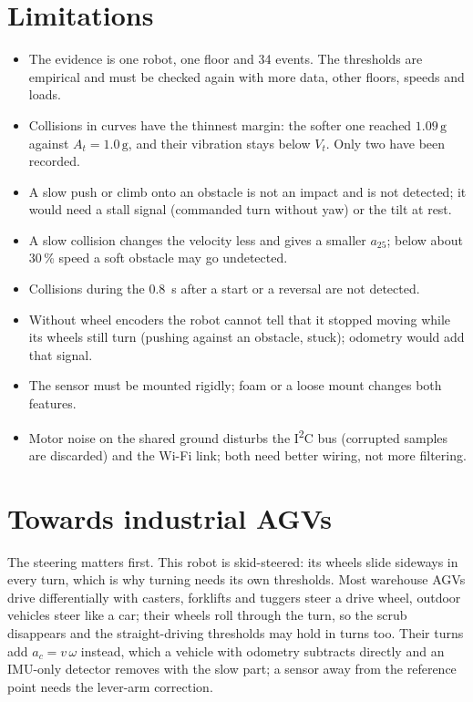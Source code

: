 \documentclass[11pt,a4paper]{article}
\newcommand{\g}{\,\mathrm{g}}
\newcommand{\azf}{a_{25}}
\begin{document}
\clearpage
\section{Limitations}

\begin{itemize}
  \item The evidence is one robot, one floor and 34 events. The thresholds are empirical and
    must be checked again with more data, other floors, speeds and loads.
  \item Collisions in curves have the thinnest margin: the softer one reached $1.09\g$
    against $A_t = 1.0\g$, and their vibration stays below $V_t$. Only two have been recorded.
  \item A slow push or climb onto an obstacle is not an impact and is not detected; it would
    need a stall signal (commanded turn without yaw) or the tilt at rest.
  \item A slow collision changes the velocity less and gives a smaller $\azf$; below about
    30\,\% speed a soft obstacle may go undetected.
  \item Collisions during the \SI{0.8}{\second} after a start or a reversal are not detected.
  \item Without wheel encoders the robot cannot tell that it stopped moving while its wheels
    still turn (pushing against an obstacle, stuck); odometry would add that signal.
  \item The sensor must be mounted rigidly; foam or a loose mount changes both features.
  \item Motor noise on the shared ground disturbs the I\textsuperscript{2}C bus (corrupted
    samples are discarded) and the Wi-Fi link; both need better wiring, not more filtering.
\end{itemize}

\section{Towards industrial AGVs}

The steering matters first. This robot is skid-steered: its wheels slide sideways in every
turn, which is why turning needs its own thresholds. Most warehouse AGVs drive differentially
with casters, forklifts and tuggers steer a drive wheel, outdoor vehicles steer like a car;
their wheels roll through the turn, so the scrub disappears and the straight-driving thresholds
may hold in turns too. Their turns add $a_c = v\,\omega$ instead, which a vehicle with odometry
subtracts directly and an IMU-only detector removes with the slow part; a sensor away from the
reference point needs the lever-arm correction.
\end{document}
